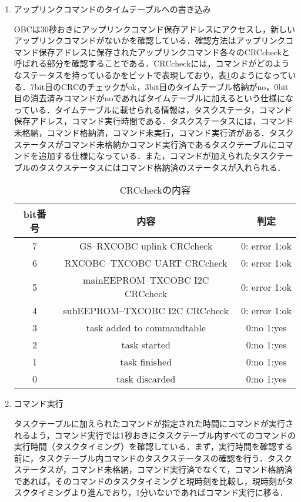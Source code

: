 \begin{enumerate}
	\item アップリンクコマンドのタイムテーブルへの書き込み\par
	OBCは30秒おきにアップリンクコマンド保存アドレスにアクセスし，新しいアップリンクコマンドがないかを確認している．確認方法はアップリンクコマンド保存アドレスに保存されたアップリンクコマンド各々のCRCcheckと呼ばれる部分を確認することである．CRCcheckには，コマンドがどのようなステータスを持っているかをビットで表現しており，表\ref{crccheck_contents}のようになっている．7bit目のCRCのチェックがok，3bit目のタイムテーブル格納がno，0bit目の消去済みコマンドがnoであればタイムテーブルに加えるという仕様になっている．タイムテーブルに載せられる情報は，タスクステータ，コマンド保存アドレス，コマンド実行時間である．タスクステータスには，コマンド未格納，コマンド格納済，コマンド未実行，コマンド実行済がある．タスクステータスがコマンド未格納かコマンド実行済であるタスクテーブルにコマンドを追加する仕様になっている．また，コマンドが加えられたタスクテーブルのタスクステータスにはコマンド格納済のステータスが入れられる．
	\begin{table}[hbtp]
		\caption{CRCcheckの内容}
		\label{crccheck_contents}
		\centering
		\begin{tabular}{ccc}
			\hline
			bit番号  & 内容  &  判定  \\
			\hline \hline
			7  & GS--RXCOBC uplink CRCcheck  & 0: error 1:ok \\
			6  & RXCOBC--TXCOBC UART  CRCcheck   & 0: error 1:ok \\
			5  & mainEEPROM--TXCOBC  I2C CRCcheck  & 0: error 1:ok \\
			4  & subEEPROM--TXCOBC  I2C CRCcheck  & 0: error 1:ok \\
			3  & task added to commandtable  & 0:no  1:yes  \\
			2  & task started   & 0:no  1:yes \\
			1  & task finished  & 0:no  1:yes \\
			0  & task discarded  & 0:no  1:yes \\
			\hline
		\end{tabular}
	\end{table}
	\par\item コマンド実行\par
	タスクテーブルに加えられたコマンドが指定された時間にコマンドが実行されるよう，コマンド実行では1秒おきにタスクテーブル内すべてのコマンドの実行時間（タスクタイミング）を確認している．まず，実行時間を確認する前に，タスクテーブル内コマンドのタスクステータスの確認を行う．タスクステータスが，コマンド未格納，コマンド実行済でなくて，コマンド格納済であれば，そのコマンドのタスクタイミングと現時刻を比較し，現時刻がタスクタイミングより進んでおり，1分いないであればコマンド実行に移る．\par

\end{enumerate}
